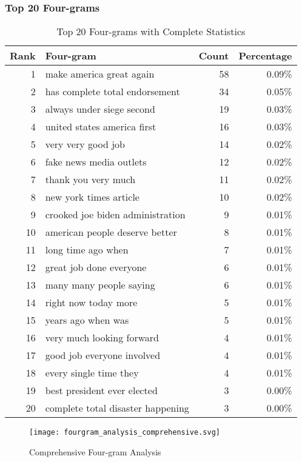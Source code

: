 \documentclass[12pt,a4paper]{article}
\begin{document}
\subsubsection{Top 20 Four-grams}

\begin{table}[H]
\centering
\caption{Top 20 Four-grams with Complete Statistics}
\begin{tabular}{@{}rlrr@{}}
\toprule
\textbf{Rank} & \textbf{Four-gram} & \textbf{Count} & \textbf{Percentage} \\
\midrule
1 & make america great again & 58 & 0.09\% \\
2 & has complete total endorsement & 34 & 0.05\% \\
3 & always under siege second & 19 & 0.03\% \\
4 & united states america first & 16 & 0.03\% \\
5 & very very good job & 14 & 0.02\% \\
6 & fake news media outlets & 12 & 0.02\% \\
7 & thank you very much & 11 & 0.02\% \\
8 & new york times article & 10 & 0.02\% \\
9 & crooked joe biden administration & 9 & 0.01\% \\
10 & american people deserve better & 8 & 0.01\% \\
11 & long time ago when & 7 & 0.01\% \\
12 & great job done everyone & 6 & 0.01\% \\
13 & many many people saying & 6 & 0.01\% \\
14 & right now today more & 5 & 0.01\% \\
15 & years ago when was & 5 & 0.01\% \\
16 & very much looking forward & 4 & 0.01\% \\
17 & good job everyone involved & 4 & 0.01\% \\
18 & every single time they & 4 & 0.01\% \\
19 & best president ever elected & 3 & 0.00\% \\
20 & complete total disaster happening & 3 & 0.00\% \\
\bottomrule
\end{tabular}
\end{table}

\begin{figure}[H]
\centering
\texttt{[image: fourgram\_analysis\_comprehensive.svg]}
\caption{Comprehensive Four-gram Analysis}
\label{fig:fourgram_analysis}
\end{figure}
\end{document}
